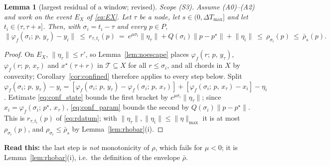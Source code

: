 \documentclass[11pt]{article}
\newtheorem{lemma}{Lemma}
\theoremstyle{remark}\newtheorem{remark}{Remark}
\newcommand{\pstar}{p^\star}
\newcommand{\norm}[1]{\lVert #1\rVert}
\newcommand{\flow}[3]{\varphi_f(#1;\,#2,\,#3)}
\newcommand{\readthis}[1]{\textbf{Read this:} #1}
\newcommand{\rev}[1]{\textcolor{blue!55!black}{#1}}
\begin{document}
\begin{lemma}[largest residual of a window; \rev{revised}]\label{lem:residual}
\emph{Scope (S3).} Assume (A0)--(A2) and work on the event $E_X$ of \eqref{eq:EX}. Let $\tau$ be a node, let $s\in(0,\Delta T_{\max}]$ and let $t_i\in(\tau,\tau+s]$. Then, with $\sigma_i=t_i-\tau$ and every $p\in P$,
\begin{equation}
\norm{\flow{\sigma_i}{p}{y_\tau}-y_i}\ \le\ r_{\tau,t_i}(p)
\ =\ e^{\mu\sigma_i}\norm{\eta_\tau}+Q(\sigma_i)\norm{p-\pstar}+\norm{\eta_i}
\ \le\ \rho_{\sigma_i}(p)\ \le\ \bar\rho_{s}(p).
\label{eq:residual}
\end{equation}
\end{lemma}
\begin{proof}
On $E_X$, $\norm{\eta_\tau}\le r'$, so Lemma~\ref{lem:noescape} places $\flow{r}{p}{y_\tau}$, $\flow{r}{p}{x_\tau}$ and $x^\star(\tau+r)$ in $\mathcal T\subseteq X$ for all $r\le\sigma_i$, and all chords in $X$ by convexity; Corollary~\ref{cor:confined} therefore applies to every step below. Split $\flow{\sigma_i}{p}{y_\tau}-y_i=[\flow{\sigma_i}{p}{y_\tau}-\flow{\sigma_i}{p}{x_\tau}]+[\flow{\sigma_i}{p}{x_\tau}-x_i]-\eta_i$. Estimate \eqref{eq:conf_state} bounds the first bracket by $e^{\mu\sigma_i}\norm{\eta_\tau}$; since $x_i=\flow{\sigma_i}{\pstar}{x_\tau}$, \eqref{eq:conf_param} bounds the second by $Q(\sigma_i)\norm{p-\pstar}$. This is $r_{\tau,t_i}(p)$ of \eqref{eq:rdatum}; with $\norm{\eta_\tau},\norm{\eta_i}\le\norm\eta_{\max}$ it is at most $\rho_{\sigma_i}(p)$, and $\rho_{\sigma_i}\le\bar\rho_s$ by Lemma~\ref{lem:rhobar}(i).
\end{proof}
\readthis{the last step is \emph{not} monotonicity of $\rho$, which fails for $\mu<0$; it is Lemma~\ref{lem:rhobar}(i), i.e.\ the definition of the envelope $\bar\rho$.}
\end{document}
